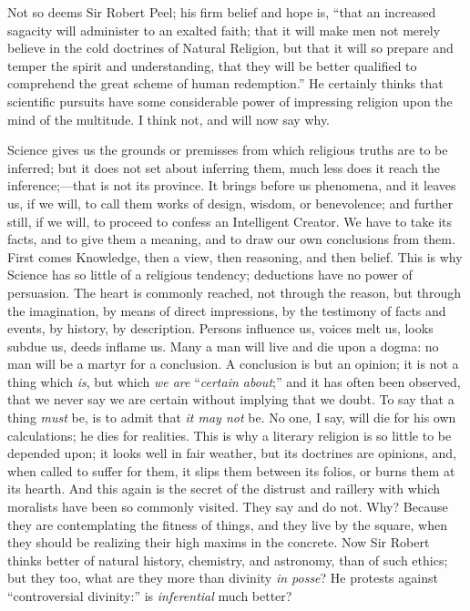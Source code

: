 Not so deems Sir Robert Peel; his firm belief and hope is,
``that an increased sagacity will administer to an exalted faith;
that it will make men not merely believe in the cold doctrines of
Natural Religion, but that it will so prepare and temper the spirit
and understanding, that they will be better qualified to comprehend
the great scheme of human redemption.'' He certainly thinks that
scientific pursuits have some considerable power of impressing
religion upon the mind of the multitude. I think not, and will now say
why.

Science gives us the grounds or premisses from which religious
truths are to be inferred; but it does not set about inferring them,
much less does it reach the inference;—that is not its
province. It brings before us phenomena, and it leaves us, if we will,
to call them works of design, wisdom, or benevolence; and further
still, if we will, to proceed to confess an Intelligent Creator. We
have to take its facts, and to give them a meaning, and to draw our
own conclusions from them. First comes Knowledge, then a view, then
reasoning, and then belief. This is why Science has so little of a
religious tendency; deductions have no power of persuasion. The heart
is commonly reached, not through the reason, but through the
imagination, by means of direct impressions, by the testimony of facts
and events, by history, by description. Persons influence us, voices
melt us, looks subdue us, deeds inflame us. Many a man will live and
die upon a dogma: no man will be a martyr for a conclusion. A
conclusion is but an opinion; it is not a thing which \emph{is}, but
which \emph{we are} ``\emph{certain about};'' and it has often
been observed, that we never say we are certain without implying that
we doubt. To say that a thing \emph{must} be, is to admit that \emph{it
may not} be. No one, I say, will die for his own calculations; he
dies for realities. This is why a literary religion is so little to be
depended upon; it looks well in fair weather, but its doctrines are
opinions, and, when called to suffer for them, it slips them between
its folios, or burns them at its hearth. And this again is the secret
of the distrust and raillery with which moralists have been so
commonly visited. They say and do not. Why? Because they are
contemplating the fitness of things, and they live by the square, when
they should be realizing their high maxims in the concrete. Now Sir
Robert thinks better of natural history, chemistry, and astronomy,
than of such ethics; but they too, what are they more than divinity \emph{in
posse}? He protests against ``controversial divinity:'' is \emph{inferential}
much better?

